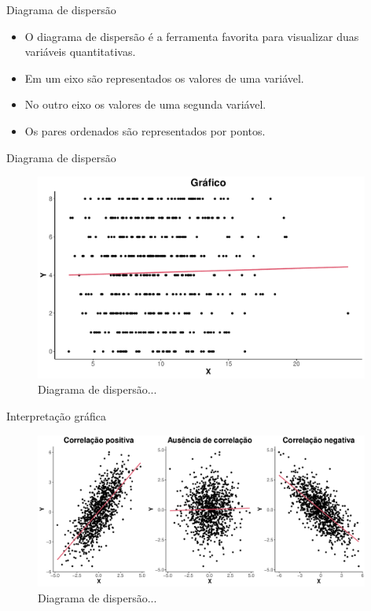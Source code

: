 \documentclass[
  ignorenonframetext,
  serif,
  professionalfont,
  usenames,
  dvipsnames,
  aspectratio = 169]{beamer}
\begin{document}
\begin{frame}{Diagrama de dispersão}
\protect\hypertarget{diagrama-de-dispersuxe3o}{}
\begin{itemize}
\item
  O diagrama de dispersão é a ferramenta favorita para visualizar duas
  variáveis quantitativas.
\item
  Em um eixo são representados os valores de uma variável.
\item
  No outro eixo os valores de uma segunda variável.
\item
  Os pares ordenados são representados por pontos.
\end{itemize}
\end{frame}

\begin{frame}{Diagrama de dispersão}
\protect\hypertarget{diagrama-de-dispersuxe3o-1}{}
\begin{figure}

{\centering \includegraphics[width=11cm]{202-exploratoria-bivariada_files/figure-beamer/unnamed-chunk-9-1} 

}

\caption{Diagrama de dispersão...}\label{fig:unnamed-chunk-9}
\end{figure}
\end{frame}

\begin{frame}{Interpretação gráfica}
\protect\hypertarget{interpretauxe7uxe3o-gruxe1fica}{}
\begin{figure}

{\centering \includegraphics[width=11cm]{202-exploratoria-bivariada_files/figure-beamer/unnamed-chunk-10-1} 

}

\caption{Diagrama de dispersão...}\label{fig:unnamed-chunk-10}
\end{figure}
\end{frame}
\end{document}
